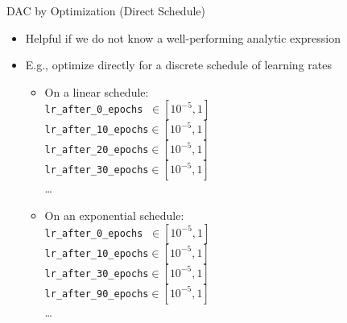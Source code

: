 \documentclass[main]{subfiles}
\begin{document}
\begin{frame}{DAC by Optimization (Direct Schedule)}
    \begin{itemize}
        \item Helpful if we do not know a well-performing analytic expression
        \item E.g., optimize directly for a discrete schedule of learning rates
        \begin{itemize}
            \item On a linear schedule:\\
            \texttt{lr\_after\_0\_epochs}$\;\;\in\left[10^{-5},1\right]$\\
            \texttt{lr\_after\_10\_epochs}$\in\left[10^{-5},1\right]$\\
            \texttt{lr\_after\_20\_epochs}$\in\left[10^{-5},1\right]$\\
            \texttt{lr\_after\_30\_epochs}$\in\left[10^{-5},1\right]$\\
            \ldots
            \item On an exponential schedule:\\
            \texttt{lr\_after\_0\_epochs}$\;\;\in\left[10^{-5},1\right]$\\
            \texttt{lr\_after\_10\_epochs}$\in\left[10^{-5},1\right]$\\
            \texttt{lr\_after\_30\_epochs}$\in\left[10^{-5},1\right]$\\
            \texttt{lr\_after\_90\_epochs}$\in\left[10^{-5},1\right]$\\
            \ldots
        \end{itemize}
    \end{itemize}
\end{frame}
\end{document}
